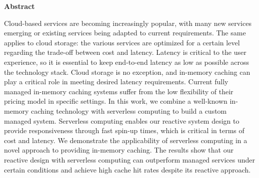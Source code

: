 \clearpage
\null
\vfil
\thispagestyle{plain}
\begin{center}\textbf{Abstract}\end{center}
Cloud-based services are becoming increasingly popular, with many new services emerging or existing services being adapted to current requirements. The same applies to cloud storage: the various services are optimized for a certain level regarding the trade-off between cost and latency. Latency is critical to the user experience, so it is essential to keep end-to-end latency as low as possible across the technology stack. Cloud storage is no exception, and in-memory caching can play a critical role in meeting desired latency requirements. Current fully managed in-memory caching systems suffer from the low flexibility of their pricing model in specific settings. In this work, we combine a well-known in-memory caching technology with serverless computing to build a custom managed system. Serverless computing enables our reactive system design to provide responsiveness through fast spin-up times, which is critical in terms of cost and latency. We demonstrate the applicability of serverless computing in a novel approach to providing in-memory caching. The results show that our reactive design with serverless computing can outperform managed services under certain conditions and achieve high cache hit rates despite its reactive approach.
\vfil
\clearpage 
